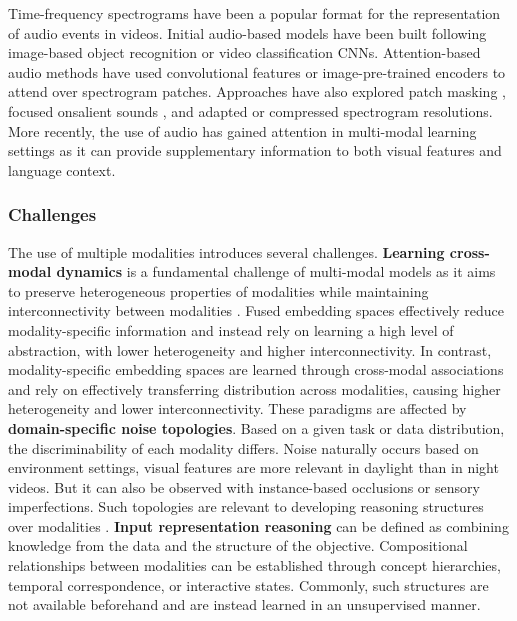 Time-frequency spectrograms have been a popular format for the representation of audio events in videos. Initial audio-based models have been built following image-based object recognition \citep{gong2021psla} or video classification \citep{kazakos2021slow} CNNs. Attention-based audio methods have used convolutional features \citep{gulati2020conformer,kong2020panns} or image-pre-trained encoders \citep{koutini2021efficient} to attend over spectrogram patches. Approaches have also explored patch masking \citep{baade2022mae,huang2022masked}, focused onsalient sounds \citep{stergiou2023play}, and adapted \citep{liu2022learning_the} or compressed \citep{feng2024coarse} spectrogram resolutions. More recently, the use of audio has gained attention in multi-modal learning settings as it can provide supplementary information to both visual features and language context. 


\subsubsection{Challenges}

The use of multiple modalities introduces several challenges. \textbf{Learning cross-modal dynamics} is a fundamental challenge of multi-modal models as it aims to preserve heterogeneous properties of modalities while maintaining interconnectivity between modalities \citep{liang2022foundations}. Fused embedding spaces \citep{girdhar2023imagebind,girdhar2022omnivore,piergiovanni2023rethinking,zhu2024languagebind} effectively reduce modality-specific information and instead rely on learning a high level of abstraction, with lower heterogeneity and higher interconnectivity. In contrast, modality-specific embedding spaces \citep{gong2022uavm,gong2023contrastive,chen2024soundingactions,recasens2021broaden} are learned through cross-modal associations and rely on effectively transferring distribution across modalities, causing higher heterogeneity and lower interconnectivity. These paradigms are affected by \textbf{domain-specific noise topologies}. Based on a given task or data distribution, the discriminability of each modality differs. Noise naturally occurs based on environment settings, \eg visual features are more relevant in daylight than in night videos. But it can also be observed with instance-based occlusions or sensory imperfections. Such topologies are relevant to developing reasoning structures over modalities \citep{gat2021perceptual}. \textbf{Input representation reasoning} can be defined as combining knowledge from the data and the structure of the objective. Compositional relationships between modalities can be established through concept hierarchies, temporal correspondence, or interactive states. Commonly, such structures are not available beforehand and are instead learned in an unsupervised manner.




